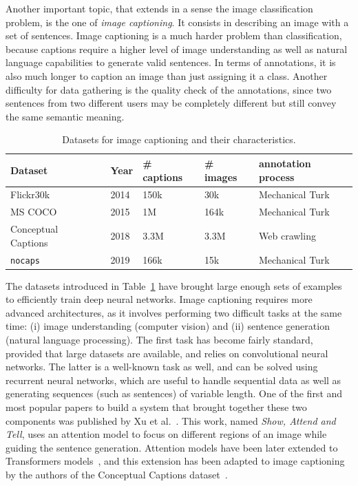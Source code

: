 Another important topic, that extends in a sense the image classification problem,
is the one of \textit{image captioning}.
It consists in describing an image with a set of sentences.
Image captioning is a much harder problem than classification,
because captions require a higher level of image understanding as well as
natural language capabilities to generate valid sentences.
In terms of annotations, it is also much longer to caption
an image than just assigning it a class.
Another difficulty for data gathering is the quality check of the annotations,
since two sentences from two different users may be
completely different but still convey the same semantic meaning.

\begin{table}
\centering
\caption{Datasets for image captioning and their characteristics.}
\begin{tabular}{lllll}
	Dataset & Year & \# captions & \# images & annotation process \\
	\midrule
	Flickr30k~\cite{flickr30k} & 2014 & 150k & 30k & Mechanical Turk \\
	MS COCO~\cite{chen2015microsoft} & 2015 & 1M & 164k & Mechanical Turk \\
	Conceptual Captions~\cite{sharma-etal-2018-conceptual} & 2018 & 3.3M & 3.3M & Web crawling \\
	\texttt{nocaps}~\cite{agrawal2019nocaps} & 2019 &  166k & 15k & Mechanical Turk \\
\end{tabular}%
\label{tab:caption_ds}
\end{table}

The datasets introduced in Table~\ref{tab:caption_ds} have brought
large enough sets of examples to efficiently train deep neural networks.
Image captioning requires more advanced architectures,
as it involves performing two difficult tasks at the same time:
(i) image understanding (computer vision) and
(ii) sentence generation (natural language processing).
The first task has become fairly standard, provided that large datasets are available,
and relies on convolutional neural networks.
The latter is a well-known task as well,
and can be solved using recurrent neural networks,
which are useful to handle sequential data as well as generating sequences
(such as sentences) of variable length.
One of the first and most popular papers to build a system
that brought together these two components was published by Xu et al.~\cite{xu2015show}.
This work, named \textit{Show, Attend and Tell}, uses an attention model
to focus on different regions of an image while guiding the sentence generation.
Attention models have been later extended to
Transformers models~\cite{vaswani2017attention},
and this extension has been adapted to image captioning by
the authors of the Conceptual Captions dataset~\cite{sharma-etal-2018-conceptual}.

